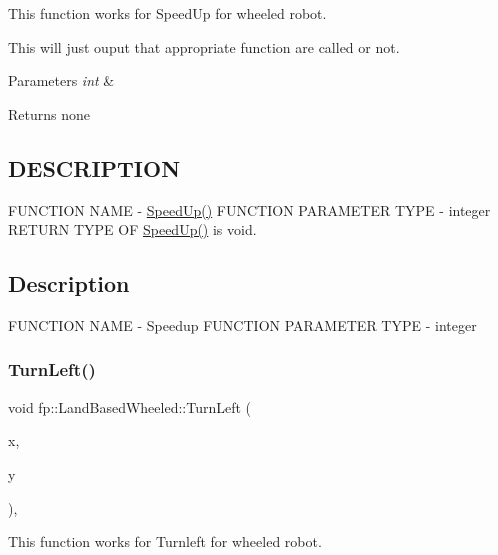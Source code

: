 This function works for Speed\+Up for wheeled robot. 

This will just ouput that appropriate function are called or not.


\begin{DoxyParams}{Parameters}
{\em int} & \\
\hline
\end{DoxyParams}
\begin{DoxyReturn}{Returns}
none 
\end{DoxyReturn}
\hypertarget{_m_a_z_e_8h_DESCRIPTION}{}\subsection{D\+E\+S\+C\+R\+I\+P\+T\+I\+ON}\label{_m_a_z_e_8h_DESCRIPTION}
F\+U\+N\+C\+T\+I\+ON N\+A\+ME -\/ \hyperlink{classfp_1_1_land_based_wheeled_a8fc1115e4c49fec71b38a520df4d1528}{Speed\+Up()} F\+U\+N\+C\+T\+I\+ON P\+A\+R\+A\+M\+E\+T\+ER T\+Y\+PE -\/ integer R\+E\+T\+U\+RN T\+Y\+PE OF \hyperlink{classfp_1_1_land_based_wheeled_a8fc1115e4c49fec71b38a520df4d1528}{Speed\+Up()} is void.\hypertarget{main_8cpp_Description}{}\subsection{Description}\label{main_8cpp_Description}
F\+U\+N\+C\+T\+I\+ON N\+A\+ME -\/ Speedup F\+U\+N\+C\+T\+I\+ON P\+A\+R\+A\+M\+E\+T\+ER T\+Y\+PE -\/ integer \mbox{\label{classfp_1_1_land_based_wheeled_a2f2434db907aaef26b8f3084e84b3579}} 
\subsubsection{\texorpdfstring{Turn\+Left()}{TurnLeft()}}
{\footnotesize\ttfamily void fp\+::\+Land\+Based\+Wheeled\+::\+Turn\+Left (\begin{DoxyParamCaption}\item[{int}]{x,  }\item[{int}]{y }\end{DoxyParamCaption})\hspace{0.3cm}{\ttfamily [override]}, {\ttfamily [virtual]}}



This function works for Turnleft for wheeled robot. 

